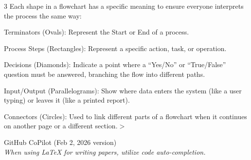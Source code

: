 \documentclass{mcmthesis}
\begin{document}
\begin{ReportAiUse}{3}
Each shape in a flowchart has a specific meaning to ensure everyone interprets the process the same way:

Terminators (Ovals): Represent the Start or End of a process.

Process Steps (Rectangles): Represent a specific action, task, or operation.

Decisions (Diamonds): Indicate a point where a ``Yes/No'' or ``True/False'' question must be answered, branching the flow into different paths.

Input/Output (Parallelograms): Show where data enters the system (like a user typing) or leaves it (like a printed report).

Connectors (Circles): Used to link different parts of a flowchart when it continues on another page or a different section.$>$

GitHub CoPilot (Feb 2, 2026 version)\\
\textit{When using LaTeX for writing papers, utilize code auto-completion.}
\end{ReportAiUse}
\end{document}

